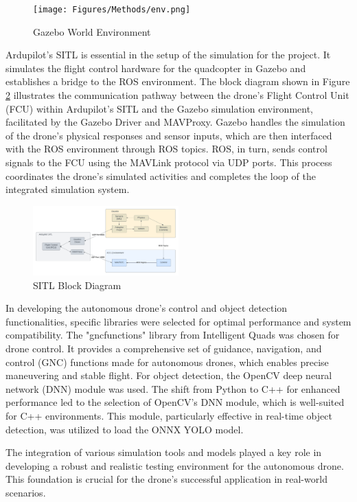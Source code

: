 \begin{figure}[H]
    \centerline{\texttt{[image: Figures/Methods/env.png]}}
    \caption{Gazebo World Environment}
    \label{fig2e2}
\end{figure}

Ardupilot's SITL is essential in the setup of the simulation for the project. It simulates the flight control hardware for the quadcopter in Gazebo and establishes a bridge to the ROS environment. The block diagram shown in Figure \ref{fig2e3} illustrates the communication pathway between the drone's Flight Control Unit (FCU) within Ardupilot's SITL and the Gazebo simulation environment, facilitated by the Gazebo Driver and MAVProxy. Gazebo handles the simulation of the drone's physical responses and sensor inputs, which are then interfaced with the ROS environment through ROS topics. ROS, in turn, sends control signals to the FCU using the MAVLink protocol via UDP ports. This process coordinates the drone's simulated activities and completes the loop of the integrated simulation system.

\begin{figure}[H]
    \centerline{\includegraphics[width=0.5\textwidth]{Figures/Methods/sitl_block_diagram.png}}
    \caption{SITL Block Diagram}
    \label{fig2e3}
\end{figure}

In developing the autonomous drone's control and object detection functionalities, specific libraries were selected for optimal performance and system compatibility. The "gnc\textunderscore functions" library from Intelligent Quads was chosen for drone control\cite{2e2}. It provides a comprehensive set of guidance, navigation, and control (GNC) functions made for autonomous drones, which enables precise maneuvering and stable flight. For object detection, the OpenCV deep neural network (DNN) module was used. The shift from Python to C++ for enhanced performance led to the selection of OpenCV's DNN module, which is well-suited for C++ environments. This module, particularly effective in real-time object detection, was utilized to load the ONNX YOLO model.


The integration of various simulation tools and models played a key role in developing a robust and realistic testing environment for the autonomous drone. This foundation is crucial for the drone's successful application in real-world scenarios.